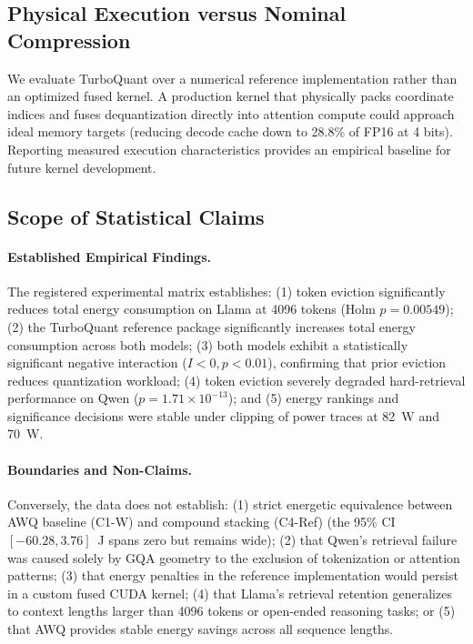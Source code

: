 \documentclass[sigconf,nonacm]{acmart}
\begin{document}
\subsection{Physical Execution versus Nominal Compression}
We evaluate TurboQuant over a numerical reference implementation rather than an optimized fused kernel. A production kernel that physically packs coordinate indices and fuses dequantization directly into attention compute could approach ideal memory targets (reducing decode cache down to 28.8\% of FP16 at 4 bits). Reporting measured execution characteristics provides an empirical baseline for future kernel development.

\subsection{Scope of Statistical Claims}
\paragraph{Established Empirical Findings.}
The registered experimental matrix establishes: (1) token eviction significantly reduces total energy consumption on Llama at 4096 tokens (Holm $p = 0.00549$); (2) the TurboQuant reference package significantly increases total energy consumption across both models; (3) both models exhibit a statistically significant negative interaction ($I < 0, p < 0.01$), confirming that prior eviction reduces quantization workload; (4) token eviction severely degraded hard-retrieval performance on Qwen ($p = 1.71 \times 10^{-13}$); and (5) energy rankings and significance decisions were stable under clipping of power traces at 82~W and 70~W.

\paragraph{Boundaries and Non-Claims.}
Conversely, the data does not establish: (1) strict energetic equivalence between AWQ baseline (C1-W) and compound stacking (C4-Ref) (the 95\% CI $[-60.28, 3.76]$~J spans zero but remains wide); (2) that Qwen's retrieval failure was caused solely by GQA geometry to the exclusion of tokenization or attention patterns; (3) that energy penalties in the reference implementation would persist in a custom fused CUDA kernel; (4) that Llama's retrieval retention generalizes to context lengths larger than 4096 tokens or open-ended reasoning tasks; or (5) that AWQ provides stable energy savings across all sequence lengths.
\end{document}
